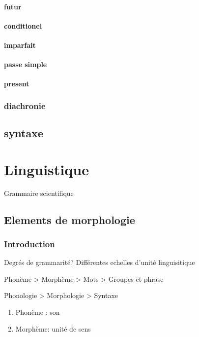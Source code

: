 \documentclass[a4paper]{report}
\theoremstyle{definition}
\theoremstyle{remark}
\begin{document}
\subsubsection{futur}

\subsubsection{conditionel}

\subsubsection{imparfait}

\subsubsection{passe simple}

\subsubsection{present}

\subsection{diachronie}

\section{syntaxe}

\chapter{Linguistique}

Grammaire scientifique

\section{Elements de morphologie}

\subsection{Introduction}

Degrés de grammarité? Différentes echelles d'unité linguisitique \par

Phonème > Morphème > Mots > Groupes et phrase \par
Phonologie > Morphologie > Syntaxe
\begin{enumerate}
    \item Phonème : son
    \item Morphème: unité de sens 
\end{enumerate}
\end{document}
